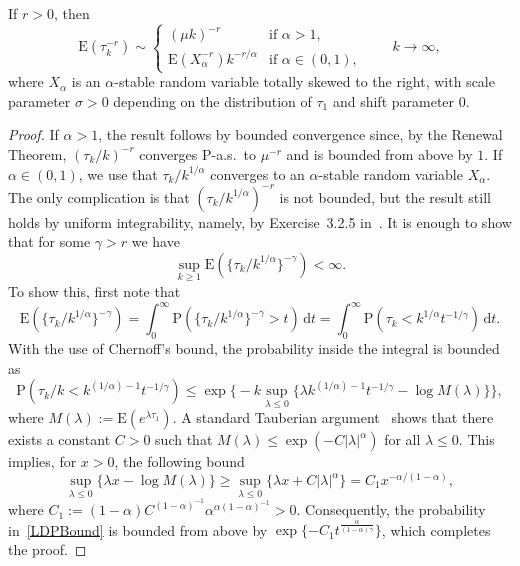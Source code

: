 \documentclass[AHL,Unicode,longabstracts]{cedram}
\newcommand{\ga}{\alpha}
\newcommand{\gga}{\gamma}
\newcommand{\gl}{\lambda}
\newcommand{\gs}{\sigma}
\newcommand{\dd}{\mathrm{d}}
\newcommand\bP{\ensuremath{\mathrm{P}}}
\newcommand\bE{\ensuremath{\mathrm{E}}}
\begin{document}
\begin{lemm}\label{lem:conv.power.tauk}
If $r > 0$, then
\begin{equation}
\bE(\tau_k^{- r}) \sim
\begin{cases}
(\mu k)^{- r} & \text{if } \ga > 1,\\[4pt]
\bE(X_\ga^{- r}) k^{- r/\ga} & \text{if } \ga \in (0,1),
\end{cases}
\qquad k \to \infty,
\end{equation}
where $X_\ga$ is an $\ga$-stable random variable totally skewed to the right, with scale parameter $\gs > 0$ depending on the distribution of $\tau_1$ and shift parameter $0$.
\end{lemm}

\begin{proof}
If $\ga > 1$, the result follows by bounded convergence since, by the Renewal Theorem, $(\tau_k/k)^{- r}$ converges $\bP$-a.s.~to $\mu^{- r}$ and is bounded from above by $1$. If $\ga \in (0,1)$, we use that $\tau_k/k^{1/\ga}$ converges to an $\ga$-stable random variable $X_\ga$. The only complication is that $(\tau_k/k^{1/\ga})^{- r}$ is not bounded, but the result still holds by uniform integrability, namely, by Exercise~3.2.5 in~\cite{Du10}. It is enough to show that for some $\gga > r$ we have
\begin{equation}\label{eq:UItau}
\sup_{k\geq1} \bE(\{\tau_k/k^{1/\ga}\}^{- \gga}) < \infty.
\end{equation}
To show this, first note that
\begin{equation}\label{ExpectationTail}
\bE(\{\tau_k/k^{1/\ga}\}^{- \gga}) = \int_0^\infty \bP(\{\tau_k/k^{1/\ga}\}^{- \gga} > t) \, \dd t = \int_0^\infty \bP(\tau_k < k^{1/\ga} t^{- 1/\gga}) \, \dd t.
\end{equation}
With the use of Chernoff's bound, the probability inside the integral is bounded as
\begin{equation}\label{LDPBound}
\bP(\tau_k/k < k^{(1/\ga) - 1} t^{- 1/\gga}) \leq \exp \Big\{ - k \sup_{\gl\leq0} \{\gl k^{(1/\ga) - 1} t^{- 1/\gga} - \log M(\gl)\} \Big\},
\end{equation}
where $M(\gl) := \bE(e^{\gl \tau_1})$. A standard Tauberian argument~\cite[(5.22) of Chapter~XIII]{Feller71} shows that there exists a constant $C > 0$ such that $M(\gl) \leq \exp({- C |\gl|^\ga})$ for all $\gl \leq 0$. This implies, for $x > 0$, the following bound
\begin{equation}
\sup_{\gl\leq0} \{\gl x - \log M(\gl)\} \geq \sup_{\gl\leq0} \{\gl x + C |\gl|^\ga\} = C_1 x^{- \ga/(1 - \ga)},
\end{equation}
where $C_1 := (1 - \ga) C^{(1 - \ga)^{-1}} \ga^{\ga (1 - \ga)^{-1}} > 0$. Consequently, the probability in~\eqref{LDPBound} is bounded from above by $\exp\{- C_1 t^\frac{\ga}{(1 - \ga) \gga}\}$, which completes the proof.
\end{proof}
\end{document}
